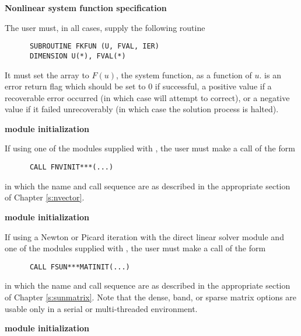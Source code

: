%
\begin{Steps}
 
\item {\bf Nonlinear system function specification}
  
  The user must, in all cases, supply the following {\F} routine
\begin{verbatim}
      SUBROUTINE FKFUN (U, FVAL, IER)
      DIMENSION U(*), FVAL(*)
\end{verbatim}
  It must set the  array to $F(u)$, the system function,
  as a function of  $u$.  
   is an error return flag which should be set to $0$ if successful,
  a positive value if a recoverable error occurred (in which case {\kinsol}
  will attempt to correct), or a negative value if it failed unrecoverably
  (in which case the solution process is halted).

\item  {\bf {\nvector} module initialization}

  If using one of the {\nvector} modules supplied with {\sundials},
  the user must make a call of the form
\begin{verbatim}
      CALL FNVINIT***(...)
\end{verbatim}
in which the name and call sequence are as described in the appropriate
section of Chapter \ref{s:nvector}.

\item\label{i:fkin_matrix_init} {\bf {\sunmatrix} module initialization}

  If using a Newton or Picard iteration with the direct {\sunlinsol} linear solver
  module and one of the {\sunmatrix} modules supplied with {\sundials}, 
  the user must make a call of the form
\begin{verbatim}
      CALL FSUN***MATINIT(...)
\end{verbatim}
in which the name and call sequence are as described in the appropriate
section of Chapter \ref{s:sunmatrix}.  Note that the dense, band, or
sparse matrix options are usable only in a serial or multi-threaded
environment. 

\item\label{i:fkin_linsol_init} {\bf {\sunlinsol} module initialization}


\end{Steps}
